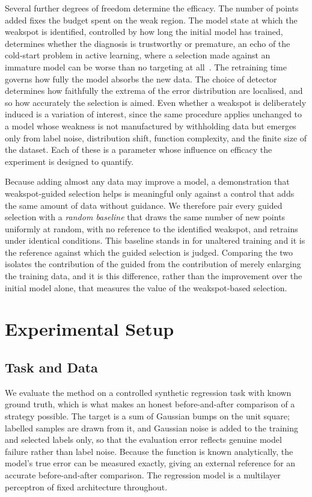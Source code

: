 \documentclass[conference]{IEEEtran}
\begin{document}
Several further degrees of freedom determine the efficacy. The number
of points added fixes the budget spent on the weak region. The model state at
which the weakspot is identified, controlled by how long the initial model has
trained, determines whether the diagnosis is trustworthy or premature, an echo of
the cold-start problem in active learning, where a selection made against an
immature model can be worse than no targeting at all~\cite{chen2022coldstart}. The
retraining time governs how fully the model absorbs the new data. The choice of
detector determines how faithfully the extrema of the error distribution are
localised, and so how accurately the selection is aimed. Even whether a weakspot
is deliberately induced is a variation of interest, since the same procedure
applies unchanged to a model whose weakness is not manufactured by withholding
data but emerges only from label noise, distribution shift, function complexity,
and the finite size of the dataset. Each of these is a parameter whose influence on
efficacy the experiment is designed to quantify.

Because adding almost any data may improve a model, a demonstration that
weakspot-guided selection helps is meaningful only against a control that adds the
same amount of data without guidance. We therefore pair every guided selection
with a \emph{random baseline} that draws the same number of new points uniformly
at random, with no reference to the identified weakspot, and retrains under
identical conditions. This baseline stands in for unaltered training and it is the
reference against which the guided selection is judged. Comparing the two isolates
the contribution of the guided from the contribution of merely enlarging the
training data, and it is this difference, rather than the improvement over the
initial model alone, that measures the value of the weakspot-based selection.

\section{Experimental Setup}
\label{sec:setup}

\subsection{Task and Data}
We evaluate the method on a controlled synthetic regression task with known ground
truth, which is what makes an honest before-and-after comparison of a
strategy possible. The target is a sum of Gaussian bumps on the unit square;
labelled samples are drawn from it, and Gaussian noise is added to the training and
selected labels only, so that the evaluation error reflects genuine model failure
rather than label noise. Because the function is known analytically, the model's true error can be measured
exactly, giving an external reference for an accurate before-and-after comparison. The
regression model is a multilayer perceptron of fixed architecture throughout.
\end{document}
